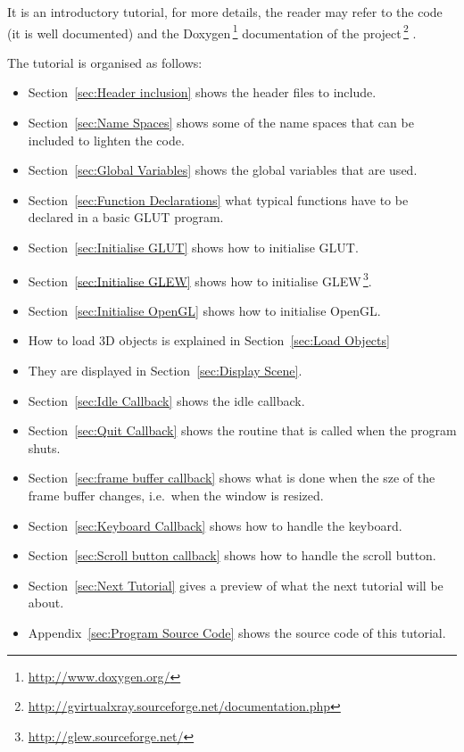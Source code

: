\documentclass[11pt,oneside,a4paper,final]{article}
\begin{document}
It is an introductory tutorial, for more details, the reader may refer to the 
code (it is well documented) and the 
Doxygen\,\footnote{\url{http://www.doxygen.org/}} documentation of the 
project\,\footnote{\url{http://gvirtualxray.sourceforge.net/documentation.php}}
. 

The tutorial is organised as follows:
\begin{itemize}
 \item Section~\ref{sec:Header inclusion} shows the header files to include. 

 \item Section~\ref{sec:Name Spaces} shows some of the name spaces that can be 
	included to lighten the code. 

 \item Section~\ref{sec:Global Variables} shows the global variables that are 
	used. 

 \item Section~\ref{sec:Function Declarations} what typical functions have to 
	be declared in a basic GLUT program. 

 \item Section~\ref{sec:Initialise GLUT} shows how to initialise GLUT. 

 \item Section~\ref{sec:Initialise GLEW} shows how to initialise 
    GLEW\,\footnote{\url{http://glew.sourceforge.net/}}. 

 \item Section~\ref{sec:Initialise OpenGL} shows how to initialise OpenGL. 

 \item How to load 3D objects is explained in Section~\ref{sec:Load Objects} 

 \item They are displayed in Section~\ref{sec:Display Scene}.

 \item Section~\ref{sec:Idle Callback} shows the idle callback. 

 \item Section~\ref{sec:Quit Callback} shows the routine that is called when 
  the program shuts.

 \item Section~\ref{sec:frame buffer callback} shows what is done when the sze 
of the frame buffer changes, i.e.~when the window is resized.

 \item Section~\ref{sec:Keyboard Callback} shows how to handle the keyboard.

 \item Section~\ref{sec:Scroll button callback} shows how to handle the 
  scroll button.
  
 \item Section~\ref{sec:Next Tutorial} gives a preview of what the next 
  tutorial will be about.
 
 \item Appendix~\ref{sec:Program Source Code} shows the source code of this 
	tutorial. 
	
\end{itemize}
\end{document}
